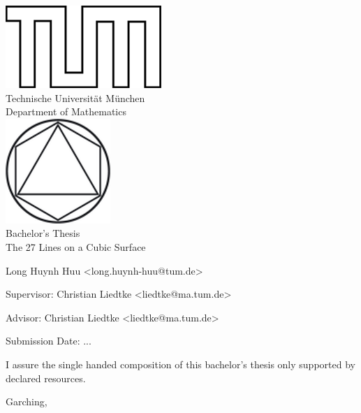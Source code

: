 \begin{titlepage}
\begin{center}
\includegraphics{TUMlschwarz.png}\\[3mm]
\sf
{\Large
  Technische Universit\"at M\"unchen\\[5mm]
  Department of Mathematics\\[8mm]
}
\normalsize
\includegraphics{TUMlMschwarz.png}\\[15mm]

Bachelor's Thesis\\[15mm]

{\Huge
  The 27 Lines on a Cubic Surface
}
\bigskip

\normalsize

Long Huynh Huu <long.huynh-huu@tum.de>
\end{center}
\vspace*{75mm}

Supervisor: Christian Liedtke <liedtke@ma.tum.de>
\medskip

Advisor: Christian Liedtke <liedtke@ma.tum.de>
\medskip

Submission Date: ...

\end{titlepage}


\vspace*{150mm}

I assure the single handed composition of this bachelor's thesis only supported by declared resources.
\bigskip

Garching, 
\newpage
